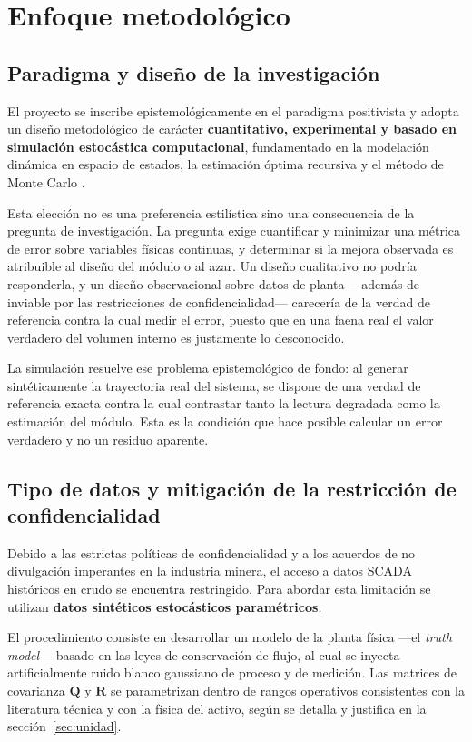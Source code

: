 \section{Enfoque metodológico}
\label{sec:enfoque}

\subsection{Paradigma y diseño de la investigación}

El proyecto se inscribe epistemológicamente en el paradigma positivista y adopta
un diseño metodológico de carácter \textbf{cuantitativo, experimental y basado
en simulación estocástica computacional}, fundamentado en la modelación dinámica
en espacio de estados, la estimación óptima recursiva y el método de Monte Carlo
\parencite{kalman1960,simon2006}.

Esta elección no es una preferencia estilística sino una consecuencia de la
pregunta de investigación. La pregunta exige cuantificar y minimizar una métrica
de error sobre variables físicas continuas, y determinar si la mejora observada
es atribuible al diseño del módulo o al azar. Un diseño cualitativo no podría
responderla, y un diseño observacional sobre datos de planta —además de
inviable por las restricciones de confidencialidad— carecería de la verdad de
referencia contra la cual medir el error, puesto que en una faena real el valor
verdadero del volumen interno es justamente lo desconocido.

La simulación resuelve ese problema epistemológico de fondo: al generar
sintéticamente la trayectoria real del sistema, se dispone de una verdad de
referencia exacta contra la cual contrastar tanto la lectura degradada como la
estimación del módulo. Esta es la condición que hace posible calcular un error
verdadero y no un residuo aparente.

\subsection{Tipo de datos y mitigación de la restricción de confidencialidad}

Debido a las estrictas políticas de confidencialidad y a los acuerdos de no
divulgación imperantes en la industria minera, el acceso a datos SCADA
históricos en crudo se encuentra restringido. Para abordar esta limitación se
utilizan \textbf{datos sintéticos estocásticos paramétricos}.

El procedimiento consiste en desarrollar un modelo de la planta física —el
\emph{truth model}— basado en las leyes de conservación de flujo, al cual se
inyecta artificialmente ruido blanco gaussiano de proceso y de medición. Las
matrices de covarianza $\mathbf{Q}$ y $\mathbf{R}$ se parametrizan dentro de
rangos operativos consistentes con la literatura técnica y con la física del
activo, según se detalla y justifica en la sección~\ref{sec:unidad}.

